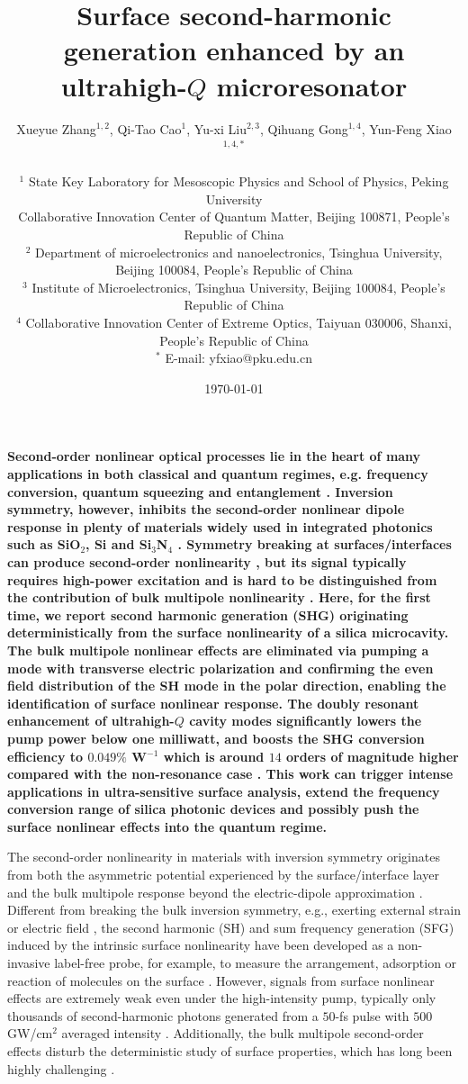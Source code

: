 \documentclass[a4paper,8pt,hyperref, twocolumn, aps, prl]{article}
\title{\bfseries \Large
Surface second-harmonic generation enhanced by an ultrahigh-$Q$ microresonator
}
\author{\normalsize  Xueyue Zhang$^{1,2}$, Qi-Tao Cao$^{1}$, Yu-xi Liu$^{2,3}$, Qihuang Gong$^{1,4}$, Yun-Feng Xiao$^{1,4,*}$ \\
  \\
\normalsize $^1$ State Key Laboratory for Mesoscopic Physics and School of Physics, Peking University \\
\normalsize Collaborative Innovation Center of Quantum Matter, Beijing 100871, People's Republic of China \\
\normalsize $^2$ Department of microelectronics and nanoelectronics, Tsinghua University, Beijing 100084, People’s Republic of China \\
\normalsize $^3$ Institute of Microelectronics, Tsinghua University, Beijing 100084, People’s Republic of China \\
\normalsize $^4$ Collaborative Innovation Center of Extreme Optics, Taiyuan 030006, Shanxi, People’s Republic of China \\
\normalsize $^*$ E-mail: yfxiao@pku.edu.cn
}
\date{\normalsize \today}
\begin{document}
\maketitle


\textbf{
Second-order nonlinear optical processes lie in the heart of many applications in both classical and quantum regimes, e.g. frequency conversion,  quantum squeezing and entanglement \cite{boyd2003nonlinear, pereira1988generation, kwiat1995new}.
Inversion symmetry, however, inhibits the second-order nonlinear dipole response in plenty of materials widely used in integrated photonics such as SiO$_2$, Si and Si$_3$N$_4$ \cite{boyd2003nonlinear, leuthold2010nonlinear, moss2013new}.
Symmetry breaking at surfaces/interfaces can produce second-order nonlinearity \cite{shen1989surface, heinz1991second, bloembergen1968optical, cazzanelli2016second}, but its signal typically requires high-power excitation and is hard to be distinguished from the contribution of bulk multipole nonlinearity \cite{heinz1991second, sun2015surface}.
Here, for the first time, we report second harmonic generation (SHG) originating deterministically from the surface nonlinearity of a silica microcavity.
The bulk multipole nonlinear effects are eliminated via pumping a mode with transverse electric polarization and confirming the even  field distribution of the SH mode in the polar direction, enabling the identification of surface nonlinear response.
The doubly resonant enhancement of ultrahigh-$Q$ cavity modes significantly lowers the pump power below one milliwatt, and boosts the SHG conversion efficiency to $0.049\%$ W$^{-1}$ which is around $14$ orders of magnitude higher compared with the non-resonance case \cite{tian2014recent}.
This work can trigger intense applications in ultra-sensitive surface analysis, extend the frequency conversion range of silica photonic devices and possibly push the surface nonlinear effects into the quantum regime.
}

The second-order nonlinearity in materials with inversion symmetry originates from both the asymmetric potential experienced by the surface/interface layer and the bulk multipole response beyond the electric-dipole approximation \cite{shen1989surface, heinz1991second}.
Different from breaking the bulk inversion symmetry, e.g., exerting external strain \cite{jacobsen2006strained, cazzanelli2012second} or electric field \cite{timurdogan2017electric}, the second harmonic (SH) and sum frequency generation (SFG) induced by the intrinsic surface nonlinearity have been developed as a non-invasive label-free probe, for example, to measure the arrangement,  adsorption or reaction of molecules on the surface \cite{sun2015surface, heinz1983determination, corn1994optical}.
However, signals from surface nonlinear effects are extremely weak even under the high-intensity pump, typically only thousands of second-harmonic photons generated from a $50$-fs pulse with $500$ GW/cm$^{2}$ averaged intensity \cite{tian2014recent}.
Additionally, the bulk multipole second-order effects disturb the deterministic study of surface properties, which has long been highly challenging \cite{heinz1991second, tian2014recent}.
\end{document}
